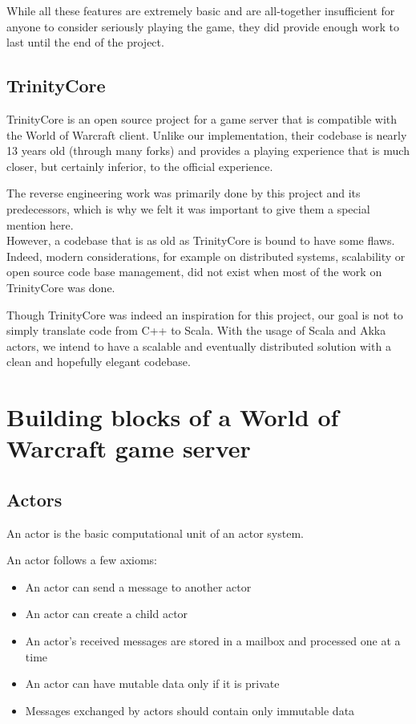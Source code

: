 \documentclass[paper=a4, fontsize=11pt]{scrartcl}
\begin{document}
While all these features are extremely basic and are all-together insufficient
for anyone to consider seriously playing the game, they did provide enough work
to last until the end of the project.

\subsection{TrinityCore}

TrinityCore is an open source project for a game server that is compatible with
the World of Warcraft client.
Unlike our implementation, their codebase is nearly 13 years old (through many
forks) and provides a playing experience that is much closer, but certainly
inferior, to the official experience.

The reverse engineering work was primarily done by this project and its
predecessors, which is why we felt it was important to give them a special
mention here.\\

However, a codebase that is as old as TrinityCore is bound to have some
flaws. Indeed, modern considerations, for example on distributed systems,
scalability or open source code base management, did not exist when most of the
work on TrinityCore was done.

Though TrinityCore was indeed an inspiration for this project, our goal is not
to simply translate code from C++ to Scala.
With the usage of Scala and Akka actors, we intend to have a scalable and
eventually distributed solution with a clean and hopefully elegant codebase.

\section{Building blocks of a World of Warcraft game server}

\subsection{Actors}

An actor is the basic computational unit of an actor system.

An actor follows a few axioms:
\begin{itemize}
    \item An actor can send a message to another actor
    \item An actor can create a child actor
    \item An actor's received messages are stored in a mailbox and processed one
        at a time
    \item An actor can have mutable data only if it is private
    \item Messages exchanged by actors should contain only immutable data
\end{itemize}
\end{document}

